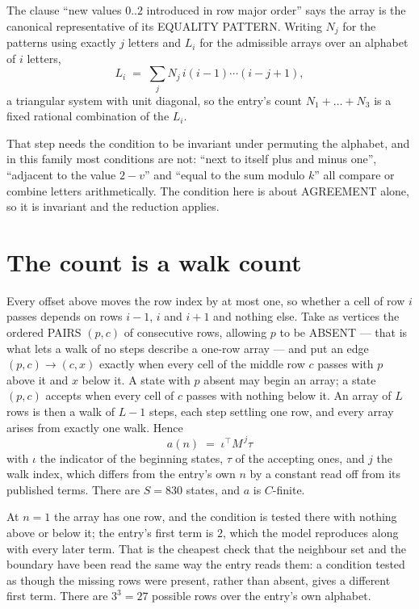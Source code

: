 \documentclass[11pt,a4paper]{article}
\theoremstyle{plain}
\theoremstyle{definition}
\begin{document}
The clause ``new values $0..2$ introduced in row major order'' says the array is the
canonical representative of its EQUALITY PATTERN. Writing $N_j$ for the patterns using exactly
$j$ letters and $L_i$ for the admissible arrays over an alphabet of $i$ letters,
\[
L_i\;=\;\sum_j N_j\,i(i-1)\cdots(i-j+1),
\]
a triangular system with unit diagonal, so the entry's count $N_1+\dots+N_{3}$ is a
fixed rational combination of the $L_i$.

That step needs the condition to be invariant under permuting the alphabet, and in this family
most conditions are not: ``next to itself plus and minus one'', ``adjacent to the value
$2-v$'' and ``equal to the sum modulo $k$'' all compare or combine letters arithmetically.
The condition here is about AGREEMENT alone, so it is invariant and the reduction applies.

\section{The count is a walk count}

Every offset above moves the row index by at most one, so whether a cell of row $i$ passes
depends on rows $i-1$, $i$ and $i+1$ and nothing else. Take as vertices the ordered PAIRS
$(p,c)$ of consecutive rows, allowing $p$ to be ABSENT --- that is what lets a walk of no steps
describe a one-row array --- and put an edge $(p,c)\to(c,x)$ exactly when every cell of the
middle row $c$ passes with $p$ above it and $x$ below it. A state with $p$ absent may begin an
array; a state $(p,c)$ accepts when every cell of $c$ passes with nothing below it. An array of
$L$ rows is then a walk of $L-1$ steps, each step settling one row, and every array arises from
exactly one walk. Hence
\[
a(n)\;=\;\iota^{\!\top}M^{\,j}\tau
\]
with $\iota$ the indicator of the beginning states, $\tau$ of the accepting ones, and $j$ the
walk index, which differs from the entry's own $n$ by a constant read off from its published
terms. There are $S=830$ states, and $a$ is $C$-finite.

At $n=1$ the array has one row, and
the condition is tested there with nothing above or below it; the entry's first term is
$2$, which the model reproduces along with every later term. That is the cheapest check
that the neighbour set and the boundary have been read the same way the entry reads them: a
condition tested as though the missing rows were present, rather than absent, gives a different
first term. There are $3^{3}=27$ possible rows over the entry's own alphabet.
\end{document}
